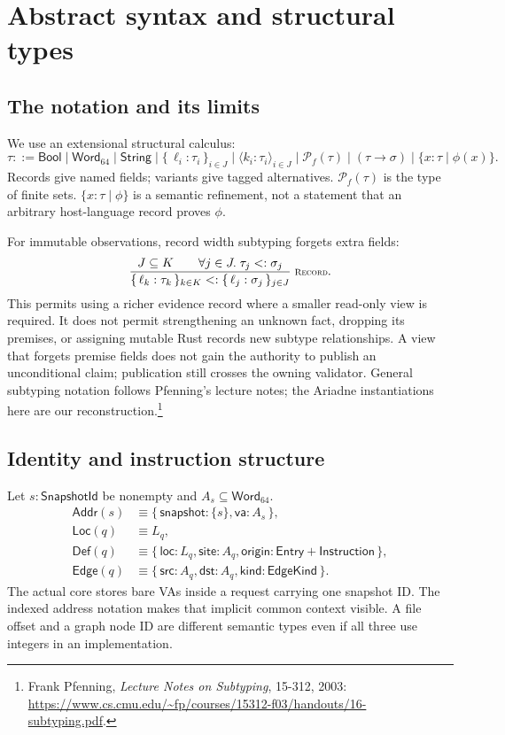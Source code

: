 \documentclass[11pt,a4paper]{article}
\newcommand{\ty}[1]{\mathsf{#1}}
\newcommand{\rec}[1]{\{\,#1\,\}}
\newcommand{\fin}{\mathcal{P}_{\!f}}
\newcommand{\rulelabel}[1]{\text{\scriptsize\textsc{#1}}}
\begin{document}
\section{Abstract syntax and structural types}
\label{sec:types}
\subsection{The notation and its limits}
We use an extensional structural calculus:
\[
 \tau::=\ty{Bool}\mid\ty{Word}_{64}\mid\ty{String}
 \mid\rec{\ell_i:\tau_i}_{i\in J}
 \mid\langle k_i:\tau_i\rangle_{i\in J}
 \mid\fin(\tau)\mid(\tau\to\sigma)
 \mid\{x:\tau\mid\phi(x)\}.
\]
Records give named fields; variants give tagged alternatives. $\fin(\tau)$
is the type of finite sets. $\{x:\tau\mid\phi\}$ is a semantic refinement,
not a statement that an arbitrary host-language record proves $\phi$.

For immutable observations, record width subtyping forgets extra fields:
\[
 \frac{J\subseteq K\qquad\forall j\in J.\;\tau_j<:\sigma_j}
 {\rec{\ell_k:\tau_k}_{k\in K}<:\rec{\ell_j:\sigma_j}_{j\in J}}
 \;\rulelabel{Record}.
\]
This permits using a richer evidence record where a smaller read-only view is
required. It does not permit strengthening an unknown fact, dropping its
premises, or assigning mutable Rust records new subtype relationships.
A view that forgets premise fields does not gain the authority to publish
an unconditional claim; publication still crosses the owning validator.
General subtyping notation follows Pfenning's lecture notes; the Ariadne
instantiations here are our reconstruction.\footnote{Frank Pfenning,
\emph{Lecture Notes on Subtyping}, 15-312, 2003:
\url{https://www.cs.cmu.edu/~fp/courses/15312-f03/handouts/16-subtyping.pdf}.}

\subsection{Identity and instruction structure}
Let $s:\ty{SnapshotId}$ be nonempty and $A_s\subseteq\ty{Word}_{64}$.
\begin{align*}
 \ty{Addr}(s)&\equiv\rec{\ty{snapshot}:\{s\},\ty{va}:A_s},\\
 \ty{Loc}(q)&\equiv L_q,\\
 \ty{Def}(q)&\equiv\rec{\ty{loc}:L_q,\ty{site}:A_q,
                  \ty{origin}:\ty{Entry}+\ty{Instruction}},\\
 \ty{Edge}(q)&\equiv\rec{\ty{src}:A_q,\ty{dst}:A_q,\ty{kind}:\ty{EdgeKind}}.
\end{align*}
The actual core stores bare VAs inside a request carrying one snapshot ID.
The indexed address notation makes that implicit common context visible.
A file offset and a graph node ID are different semantic types even if all
three use integers in an implementation.
\end{document}
